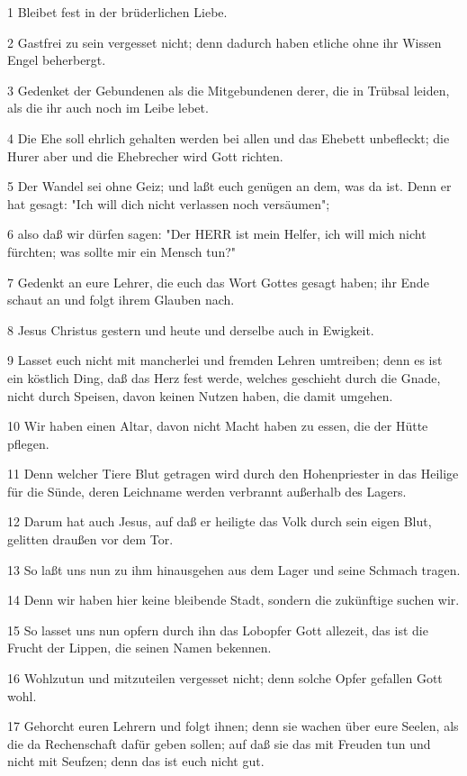 \par 1 Bleibet fest in der brüderlichen Liebe.
\par 2 Gastfrei zu sein vergesset nicht; denn dadurch haben etliche ohne ihr Wissen Engel beherbergt.
\par 3 Gedenket der Gebundenen als die Mitgebundenen derer, die in Trübsal leiden, als die ihr auch noch im Leibe lebet.
\par 4 Die Ehe soll ehrlich gehalten werden bei allen und das Ehebett unbefleckt; die Hurer aber und die Ehebrecher wird Gott richten.
\par 5 Der Wandel sei ohne Geiz; und laßt euch genügen an dem, was da ist. Denn er hat gesagt: "Ich will dich nicht verlassen noch versäumen";
\par 6 also daß wir dürfen sagen: "Der HERR ist mein Helfer, ich will mich nicht fürchten; was sollte mir ein Mensch tun?"
\par 7 Gedenkt an eure Lehrer, die euch das Wort Gottes gesagt haben; ihr Ende schaut an und folgt ihrem Glauben nach.
\par 8 Jesus Christus gestern und heute und derselbe auch in Ewigkeit.
\par 9 Lasset euch nicht mit mancherlei und fremden Lehren umtreiben; denn es ist ein köstlich Ding, daß das Herz fest werde, welches geschieht durch die Gnade, nicht durch Speisen, davon keinen Nutzen haben, die damit umgehen.
\par 10 Wir haben einen Altar, davon nicht Macht haben zu essen, die der Hütte pflegen.
\par 11 Denn welcher Tiere Blut getragen wird durch den Hohenpriester in das Heilige für die Sünde, deren Leichname werden verbrannt außerhalb des Lagers.
\par 12 Darum hat auch Jesus, auf daß er heiligte das Volk durch sein eigen Blut, gelitten draußen vor dem Tor.
\par 13 So laßt uns nun zu ihm hinausgehen aus dem Lager und seine Schmach tragen.
\par 14 Denn wir haben hier keine bleibende Stadt, sondern die zukünftige suchen wir.
\par 15 So lasset uns nun opfern durch ihn das Lobopfer Gott allezeit, das ist die Frucht der Lippen, die seinen Namen bekennen.
\par 16 Wohlzutun und mitzuteilen vergesset nicht; denn solche Opfer gefallen Gott wohl.
\par 17 Gehorcht euren Lehrern und folgt ihnen; denn sie wachen über eure Seelen, als die da Rechenschaft dafür geben sollen; auf daß sie das mit Freuden tun und nicht mit Seufzen; denn das ist euch nicht gut.
